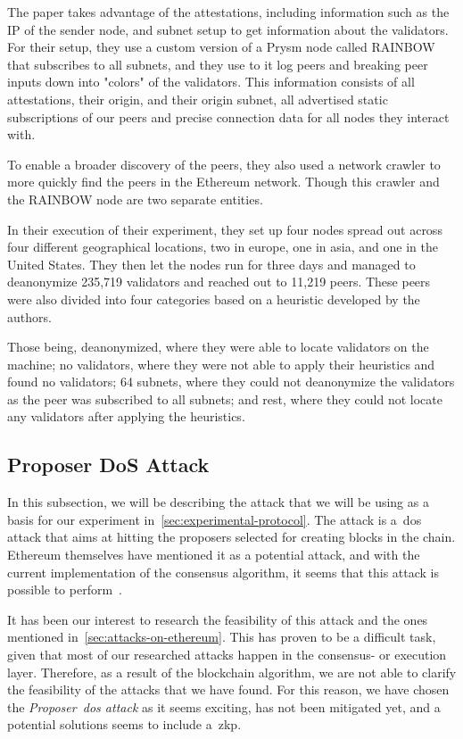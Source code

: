 The paper takes advantage of the attestations, including information such as the IP of the sender node, and subnet setup to get information about the validators.
For their setup, they use a custom version of a Prysm node called RAINBOW that subscribes to all subnets, and they use to it log peers and breaking peer inputs down into "colors" of the validators.
This information consists of all attestations, their origin, and their origin subnet, all advertised static subscriptions of our peers and precise connection data for all nodes they interact with.

To enable a broader discovery of the peers, they also used a network crawler to more quickly find the peers in the Ethereum network.
Though this crawler and the RAINBOW node are two separate entities.

In their execution of their experiment, they set up four nodes spread out across four different geographical locations, two in europe, one in asia, and one in the United States.
They then let the nodes run for three days and managed to deanonymize 235,719 validators and reached out to 11,219 peers.
These peers were also divided into four categories based on a heuristic developed by the authors.

Those being, deanonymized, where they were able to locate validators on the machine; no validators, where they were not able to apply their heuristics and found no validators; 64 subnets, where they could not deanonymize the validators as the peer was subscribed to all subnets; and rest, where they could not locate any validators after applying the heuristics.

\subsection{Proposer DoS Attack}\label{subsec:proposer-dos-attack}
In this subsection, we will be describing the attack that we will be using as a basis for our experiment in~\autoref{sec:experimental-protocol}.
The attack is a~\gls{dos} attack that aims at hitting the proposers selected for creating blocks in the chain.
Ethereum themselves have mentioned it as a potential attack, and with the current implementation of the consensus algorithm, it seems that this attack is possible to perform~\cite{EthereumSSLE2024,EthereumAttackDefense2024}.

It has been our interest to research the feasibility of this attack and the ones mentioned in~\autoref{sec:attacks-on-ethereum}.
This has proven to be a difficult task, given that most of our researched attacks happen in the consensus- or execution layer.
Therefore, as a result of the blockchain algorithm, we are not able to clarify the feasibility of the attacks that we have found.
For this reason, we have chosen the \textit{Proposer~\gls{dos} attack} as it seems exciting, has not been mitigated yet, and a potential solutions seems to include a~\gls{zkp}.

